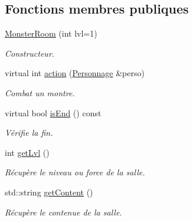 \subsection*{Fonctions membres publiques}
\begin{DoxyCompactItemize}
\item 
\hyperlink{class_monster_room_afb8b2dea2d0a3b17bf8068c1faae7bff}{Monster\-Room} (int lvl=1)
\begin{DoxyCompactList}\small\item\em Constructeur. \end{DoxyCompactList}\item 
virtual int \hyperlink{class_monster_room_ae69b27248fe57b2043d9653f3e831cb8}{action} (\hyperlink{class_personnage}{Personnage} \&perso)
\begin{DoxyCompactList}\small\item\em Combat un montre. \end{DoxyCompactList}\item 
virtual bool \hyperlink{class_room_comportement_a240991f90b07c35e0e9114e6a203ba88}{is\-End} () const 
\begin{DoxyCompactList}\small\item\em Vérifie la fin. \end{DoxyCompactList}\item 
int \hyperlink{class_room_comportement_a645473f228c0e73532a309ad512456eb}{get\-Lvl} ()
\begin{DoxyCompactList}\small\item\em Récupère le niveau ou force de la salle. \end{DoxyCompactList}\item 
std\-::string \hyperlink{class_room_comportement_a6927d638d17858a303d77b449c7552b4}{get\-Content} ()
\begin{DoxyCompactList}\small\item\em Récupère le contenue de la salle. \end{DoxyCompactList}\end{DoxyCompactItemize}
